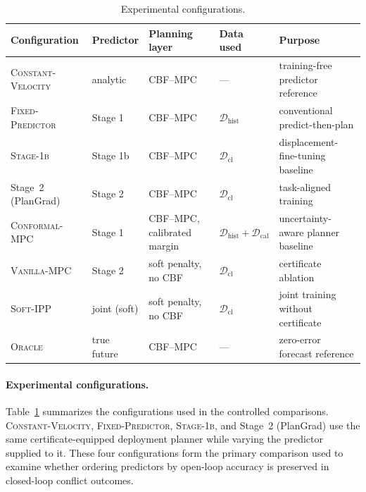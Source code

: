 \documentclass[11pt]{article}
\theoremstyle{plain}
\theoremstyle{definition}
\newcommand{\method}{PlanGrad}
\begin{document}
\begin{table}[tb]
    \centering
    \small
    \caption{Experimental configurations.}
    \label{tab:arms}
    \begin{tabular}{lllll}
        \toprule
        Configuration & Predictor & Planning layer & Data used & Purpose \\
        \midrule

        \textsc{Constant-Velocity}
        & analytic
        & CBF--MPC
        & ---
        & training-free predictor reference \\

        \textsc{Fixed-Predictor}
        & Stage 1
        & CBF--MPC
        & $\mathcal{D}_{\mathrm{hist}}$
        & conventional predict-then-plan \\

        \textsc{Stage-1b}
        & Stage 1b
        & CBF--MPC
        & $\mathcal{D}_{\mathrm{cl}}$
        & displacement-fine-tuning baseline \\

        Stage~2 (\method)
        & Stage 2
        & CBF--MPC
        & $\mathcal{D}_{\mathrm{cl}}$
        & task-aligned training \\

        \textsc{Conformal-MPC}
        & Stage 1
        & CBF--MPC, calibrated margin
        & $\mathcal{D}_{\mathrm{hist}}+\mathcal{D}_{\mathrm{cal}}$
        & uncertainty-aware planner baseline \\

        \textsc{Vanilla-MPC}
        & Stage 2
        & soft penalty, no CBF
        & $\mathcal{D}_{\mathrm{cl}}$
        & certificate ablation \\

        \textsc{Soft-IPP}
        & joint (soft)
        & soft penalty, no CBF
        & $\mathcal{D}_{\mathrm{cl}}$
        & joint training without certificate \\

        \textsc{Oracle}
        & true future
        & CBF--MPC
        & ---
        & zero-error forecast reference \\

        \bottomrule
    \end{tabular}
\end{table}

\paragraph{Experimental configurations.}
Table~\ref{tab:arms} summarizes the configurations used in the
controlled comparisons. \textsc{Constant-Velocity},
\textsc{Fixed-Predictor}, \textsc{Stage-1b}, and Stage~2 (\method)
use the same certificate-equipped deployment planner while varying
the predictor supplied to it. These four configurations form the
primary comparison used to examine whether ordering predictors by
open-loop accuracy is preserved in closed-loop conflict outcomes.
\end{document}
